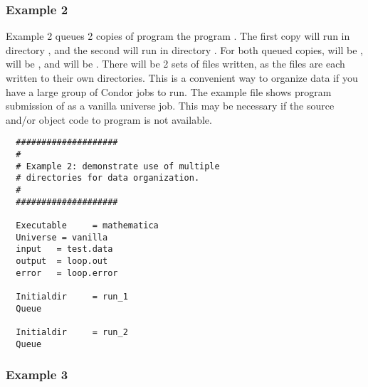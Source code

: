 \subsubsection{Example 2}

Example 2 queues 2 copies of program the program . The
first copy will run in directory , and the second will run in
directory . For both queued copies, 
 will be ,
 will be , and
 will be .
There will be 2 sets of files written,
as the files are each written to their own directories.
This is a convenient way to organize data if you
have a large group of Condor jobs to run. The example file 
shows program submission of
 as a vanilla universe job.
This may be necessary if the source
and/or object code to program  is not available.
\begin{verbatim}
  ####################     
  #                       
  # Example 2: demonstrate use of multiple     
  # directories for data organization.      
  #                                        
  ####################                    
                                         
  Executable     = mathematica          
  Universe = vanilla                   
  input   = test.data                
  output  = loop.out                
  error   = loop.error             
                                  
  Initialdir     = run_1         
  Queue                         
                               
  Initialdir     = run_2      
  Queue                     
\end{verbatim}

\subsubsection{Example 3}


